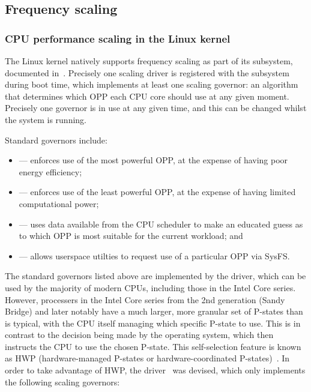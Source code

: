 \subsection{Frequency scaling}

\subsubsection{CPU performance scaling in the Linux kernel}

The Linux kernel natively supports frequency scaling as part of its 
subsystem, documented in~\cite{linuxCPUScaling}. Precisely one scaling driver is
registered with the subsystem during boot time, which implements at least one
scaling governor: an algorithm that determines which OPP each CPU core should
use at any given moment. Precisely one governor is in use at any given time,
and this can be changed whilst the system is running.

Standard governors include:
\begin{itemize}
    \item {} — enforces use of the most powerful OPP, at the
        expense of having poor energy efficiency;
    \item {} — enforces use of the least powerful OPP, at the
        expense of having limited computational power;
    \item {} — uses data available from the CPU scheduler to make
        an educated guess as to which OPP is most suitable for the current
        workload; and
    \item {} — allows userspace utilties to request use of a
        particular OPP via SysFS.
\end{itemize}

The standard governors listed above are implemented by the 
driver, which can be used by the majority of modern CPUs, including those in
the Intel Core series. However, processers in the Intel Core series from the
2nd generation (Sandy Bridge) and later notably have a much larger, more
granular set of P-states than is typical, with the CPU itself managing which
specific P-state to use. This is in contrast to the decision being made by the
operating system, which then instructs the CPU to use the chosen P-state. This
self-selection feature is known as HWP (hardware-managed P-states or
hardware-coordinated P-states)~\cite[Vol. 3, §14.3.2.3]{intelDevManual}. In
order to take advantage of HWP, the 
driver~\cite{linuxIntelPState} was devised, which only implements the following
scaling governors:


